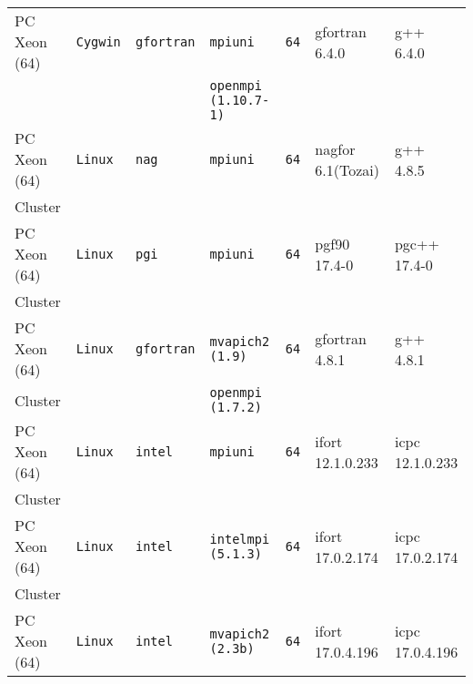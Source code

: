\begin{longtable}{lllllll}
PC Xeon (64)          &\tt Cygwin &\tt gfortran     &\tt mpiuni           &\tt 64           & gfortran \footnotesize 6.4.0        & g++  \footnotesize 6.4.0          \\
                      &           &                 &\tt openmpi (1.10.7-1)  &              &                                     &                                   \\
PC Xeon (64)          &\tt Linux  &\tt nag          &\tt mpiuni           &\tt 64           & nagfor \footnotesize 6.1(Tozai)     & g++  \footnotesize 4.8.5          \\
Cluster               &           &                 &                     &                 &                                     &                                   \\
PC Xeon (64)          &\tt Linux  &\tt pgi          &\tt mpiuni           &\tt 64           & pgf90 \footnotesize 17.4-0          & pgc++  \footnotesize 17.4-0       \\
Cluster               &           &                 &                     &                 &                                     &                                   \\
PC Xeon (64)          &\tt Linux  &\tt gfortran     &\tt mvapich2 (1.9)   &\tt 64           & gfortran \footnotesize 4.8.1        & g++ \footnotesize 4.8.1           \\
Cluster               &           &                 &\tt openmpi (1.7.2)  &                 &                                     &                                   \\
PC Xeon (64)          &\tt Linux  &\tt intel        &\tt mpiuni           &\tt 64           & ifort \footnotesize 12.1.0.233      & icpc \footnotesize 12.1.0.233     \\
Cluster               &           &                 &                     &                 &                                     &                                   \\
PC Xeon (64)          &\tt Linux  &\tt intel        &\tt intelmpi (5.1.3) &\tt 64           & ifort \footnotesize 17.0.2.174      & icpc \footnotesize 17.0.2.174     \\
Cluster               &           &                 &                     &                 &                                     &                                   \\
PC Xeon (64)          &\tt Linux  &\tt intel        &\tt mvapich2 (2.3b)  &\tt 64           & ifort \footnotesize 17.0.4.196      & icpc \footnotesize 17.0.4.196     \\

\end{longtable}
